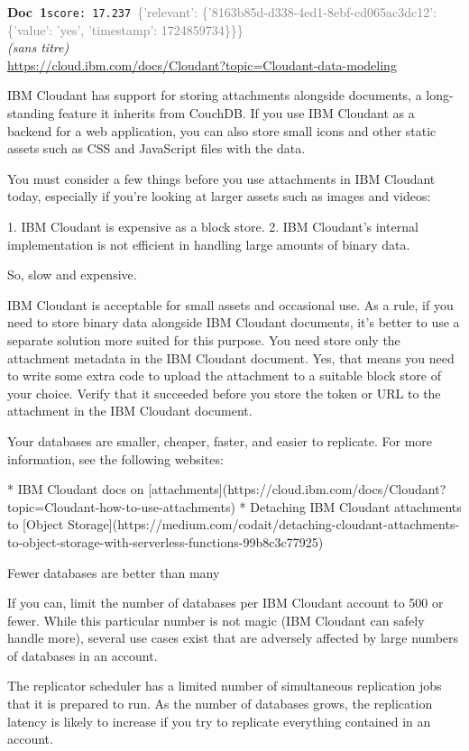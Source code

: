 \documentclass[a4paper,11pt]{article}
\begin{document}
\begin{docenv}
{\footnotesize\textcolor{doccolor}{\textbf{Doc~1}}}\hfill{\tiny\texttt{score:~17.237}}\ {\tiny\textcolor{gray}{\{'relevant': \{'8163b85d-d338-4ed1-8ebf-cd065ac3dc12': \{'value': 'yes', 'timestamp': 1724859734\}\}\}}}\\[3pt]
{\small\textit{(sans titre)}}\\[2pt]
{\tiny\url{https://cloud.ibm.com/docs/Cloudant?topic=Cloudant-data-modeling}}\\[4pt]
{\footnotesize 
IBM Cloudant has support for storing attachments alongside documents, a long-standing feature it inherits from CouchDB. If you use IBM Cloudant as a backend for a web application, you can also store small icons and other static assets such as CSS and JavaScript files with the data.

You must consider a few things before you use attachments in IBM Cloudant today, especially if you’re looking at larger assets such as images and videos:



1. IBM Cloudant is expensive as a block store.
2. IBM Cloudant’s internal implementation is not efficient in handling large amounts of binary data.



So, slow and expensive.

IBM Cloudant is acceptable for small assets and occasional use. As a rule, if you need to store binary data alongside IBM Cloudant documents, it’s better to use a separate solution more suited for this purpose. You need store only the attachment metadata in the IBM Cloudant document. Yes, that means you need to write some extra code to upload the attachment to a suitable block store of your choice. Verify that it succeeded before you store the token or URL to the attachment in the IBM Cloudant document.

Your databases are smaller, cheaper, faster, and easier to replicate. For more information, see the following websites:



* IBM Cloudant docs on [attachments](https://cloud.ibm.com/docs/Cloudant?topic=Cloudant-how-to-use-attachments)
* Detaching IBM Cloudant attachments to [Object Storage](https://medium.com/codait/detaching-cloudant-attachments-to-object-storage-with-serverless-functions-99b8c3c77925)







 Fewer databases are better than many 

If you can, limit the number of databases per IBM Cloudant account to 500 or fewer. While this particular number is not magic (IBM Cloudant can safely handle more), several use cases exist that are adversely affected by large numbers of databases in an account.

The replicator scheduler has a limited number of simultaneous replication jobs that it is prepared to run. As the number of databases grows, the replication latency is likely to increase if you try to replicate everything contained in an account.}
\end{docenv}
\end{document}
